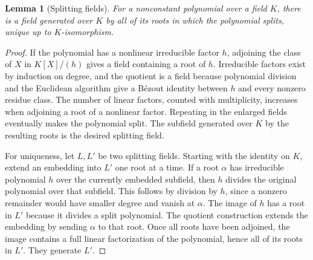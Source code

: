 \documentclass[11pt,oneside,openany]{book}
\theoremstyle{plain}
\newtheorem{lemma}[theorem]{Lemma}
\theoremstyle{definition}
\theoremstyle{remark}
\begin{document}
\begin{lemma}[Splitting fields]\label{nt:splitting-field}
For a nonconstant polynomial over a field $K$, there is a field
generated over $K$ by all of its roots in which the polynomial
splits, unique up to $K$-isomorphism.
\end{lemma}
\begin{proof}
If the polynomial has a nonlinear irreducible factor $h$, adjoining
the class of $X$ in $K[X]/(h)$ gives a field containing a root of
$h$. Irreducible factors exist by induction on degree, and the
quotient is a field because polynomial division and the Euclidean
algorithm give a B\'ezout identity between $h$ and every
nonzero residue class. The number of linear factors, counted
with multiplicity, increases when adjoining a root of a
nonlinear factor. Repeating in the enlarged fields eventually
makes the polynomial split. The subfield generated over $K$
by the resulting roots is the desired splitting field.

For uniqueness, let $L,L'$ be two splitting fields. Starting with
the identity on $K$, extend an embedding into $L'$ one root at
a time. If a root $\alpha$ has irreducible polynomial $h$ over
the currently embedded subfield, then $h$ divides the original
polynomial over that subfield. This follows by division by $h$,
since a nonzero remainder would have smaller degree and vanish
at $\alpha$. The image of $h$ has a root in $L'$ because it divides
a split polynomial. The quotient construction extends the embedding
by sending $\alpha$ to that root. Once all roots have been
adjoined, the image contains a full linear factorization of the
polynomial, hence all of its roots in $L'$. They generate $L'$.
\end{proof}
\end{document}
